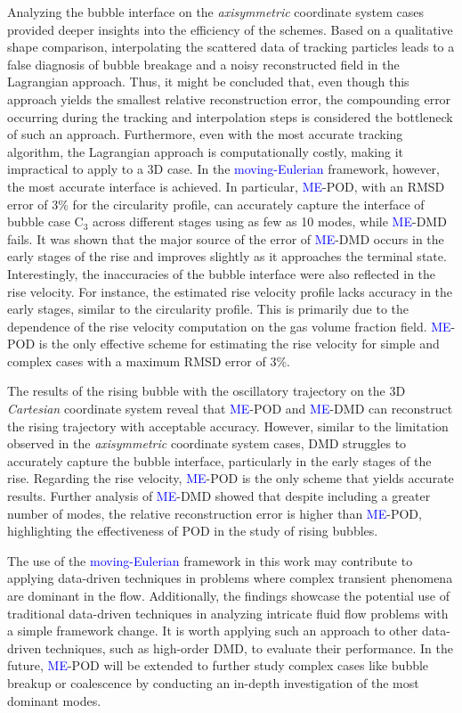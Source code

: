 \documentclass[a4paper,fleqn]{cas-sc}
\newcommand{\hl}[1]{\textcolor{blue}{#1}} %
\newcommand{\hl}[1]{#1} %
\begin{document}
	Analyzing the bubble interface on the \textit{axisymmetric} coordinate system cases provided deeper insights into the efficiency of the schemes. Based on a qualitative shape comparison, interpolating the scattered data of tracking particles leads to a false diagnosis of bubble breakage and a noisy reconstructed field in the Lagrangian approach. Thus, it might be concluded that, even though this approach yields the smallest relative reconstruction error, the compounding error occurring during the tracking and interpolation steps is considered the bottleneck of such an approach. Furthermore, even with the most accurate tracking algorithm, the Lagrangian approach is computationally costly, making it impractical to apply to a 3D case. In the \hl{moving-Eulerian} framework, however, the most accurate interface is achieved. In particular, \hl{ME}-POD, with an RMSD error of 3\% for the circularity profile, can accurately capture the interface of bubble case C$_3$ across different stages using as few as 10 modes, while \hl{ME}-DMD fails. It was shown that the major source of the error of \hl{ME}-DMD occurs in the early stages of the rise and improves slightly as it approaches the terminal state. Interestingly, the inaccuracies of the bubble interface were also reflected in the rise velocity. For instance, the estimated rise velocity profile lacks accuracy in the early stages, similar to the circularity profile. This is primarily due to the dependence of the rise velocity computation on the gas volume fraction field. \hl{ME}-POD is the only effective scheme for estimating the rise velocity for simple and complex cases with a maximum RMSD error of 3\%.
	
	The results of the rising bubble with the oscillatory trajectory on the 3D \textit{Cartesian} coordinate system reveal that \hl{ME}-POD and \hl{ME}-DMD can reconstruct the rising trajectory with acceptable accuracy. However, similar to the limitation observed in the \textit{axisymmetric} coordinate system cases, DMD struggles to accurately capture the bubble interface, particularly in the early stages of the rise. Regarding the rise velocity, \hl{ME}-POD is the only scheme that yields accurate results. Further analysis of \hl{ME}-DMD showed that despite including a greater number of modes, the relative reconstruction error is higher than \hl{ME}-POD, highlighting the effectiveness of POD in the study of rising bubbles.
	
	The use of the \hl{moving-Eulerian} framework in this work may contribute to applying data-driven techniques in problems where complex transient phenomena are dominant in the flow. Additionally, the findings showcase the potential use of traditional data-driven techniques in analyzing intricate fluid flow problems with a simple framework change. It is worth applying such an approach to other data-driven techniques, such as high-order DMD, to evaluate their performance.  In the future, \hl{ME}-POD will be extended to further study complex cases like bubble breakup or coalescence by conducting an in-depth investigation of the most dominant modes. \\
	
\end{document}

